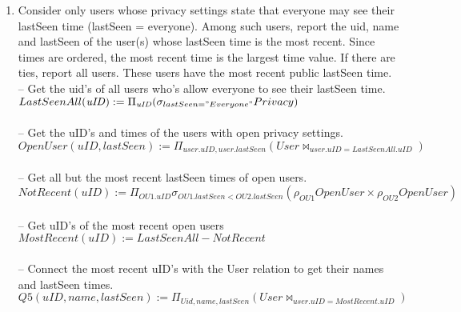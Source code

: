 \documentclass{article}
\newcommand{\var}[1]{\mathit{#1}}
\begin{document}
\begin{enumerate}
\item   %
Consider only users whose privacy settings state that everyone may see their lastSeen time (lastSeen = everyone). Among such users, report the uid, name and lastSeen of the user(s) whose lastSeen time is the most recent. Since times are ordered, the most recent time is the largest time value. If there are ties, report all users. These users have the most recent public lastSeen time. \\ [5pt]
{\large
\hspace*{1cm} -- Get the uid's of all users who's allow everyone to see their lastSeen time. \\ [5pt]
$
LastSeenAll(\var{uID}) :=
	\Pi_{\var{\var{uID}}}
	(\sigma_{lastSeen = "Everyone"} Privacy)
$ \\\\
\hspace*{1cm} -- Get the uID's and times of the users with open privacy settings. \\ [5pt]
$
OpenUser(uID, lastSeen) := 
	\Pi_{user.uID, user.lastSeen}
	(User \bowtie_{user.uID = LastSeenAll.uID})
$\\\\
\hspace*{1cm} -- Get all but the most recent lastSeen times of open users. \\ [5pt]
$
NotRecent(\var{uID}) := \Pi_{\var{OU1.uID}}
	\sigma_{OU1.\var{lastSeen} < OU2.\var{lastSeen}}
	(\rho_{OU1}OpenUser \times \rho_{OU2}OpenUser)
$\\\\
\hspace*{1cm} -- Get uID's of the most recent open users \\ [5pt]
$
MostRecent(\var{uID}) := LastSeenAll - NotRecent
$\\\\
\hspace*{1cm} -- Connect the most recent uID's with the User relation to get their names and lastSeen times. \\ [5pt]
$
Q5(\var{uID}, \var{name}, \var{lastSeen}) := 
	\Pi_{\var{Uid}, \var{name}, \var{lastSeen}} 
	(User \bowtie_{user.\var{uID} = MostRecent.\var{uID}})
$\\\\
}


\end{enumerate}
\end{document}
